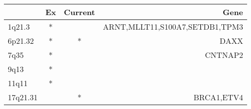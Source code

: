 \begin{tabular}{lccr}
\toprule
{} & Ex & Current &                            Gene \\
\midrule
1q21.3   &  * &         &  ARNT,MLLT11,S100A7,SETDB1,TPM3 \\
6p21.32  &  * &       * &                            DAXX \\
7q35     &  * &         &                         CNTNAP2 \\
9q13     &  * &         &                                 \\
11q11    &  * &         &                                 \\
17q21.31 &    &       * &                      BRCA1,ETV4 \\
\bottomrule
\end{tabular}

